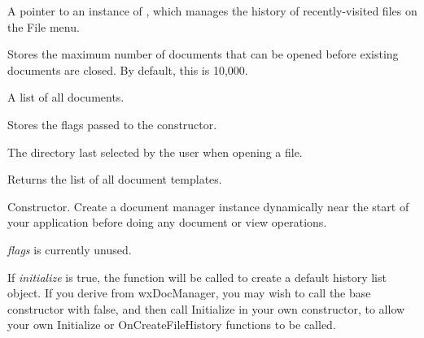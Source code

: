 A pointer to an instance of ,
which manages the history of recently-visited files on the File menu.


\label{wxdocmanagermmaxdocsopen}


Stores the maximum number of documents that can be opened before
existing documents are closed. By default, this is 10,000.


\label{wxdocmanagermdocs}


A list of all documents.


\label{wxdocmanagermflags}


Stores the flags passed to the constructor.


\label{wxdocmanagermlastdirectory}

The directory last selected by the user when opening a file.



\label{wxdocmanagergettemplates}


Returns the list of all document templates.


\label{wxdocmanagerctor}


Constructor. Create a document manager instance dynamically near the start of your application
before doing any document or view operations.

{\it flags} is currently unused.

If {\it initialize} is true, the  function will be called
to create a default history list object. If you derive from wxDocManager, you may wish to call the
base constructor with false, and then call Initialize in your own constructor, to allow
your own Initialize or OnCreateFileHistory functions to be called.


\label{wxdocmanagerdtor}

